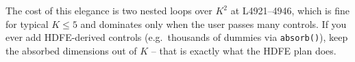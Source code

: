 \documentclass[11pt]{article}
\newcommand{\code}[1]{\texttt{\small #1}}
\newcommand{\1}{\mathbb{1}}
\begin{document}
The cost of this elegance is two nested loops over $K^{2}$ at L4921--4946,
which is fine for typical $K \le 5$ and dominates only when the user passes
many controls. If you ever add HDFE-derived controls (e.g.\ thousands of
dummies via \code{absorb()}), keep the absorbed dimensions out of $K$ -- that
is exactly what the HDFE plan does.
\end{document}
